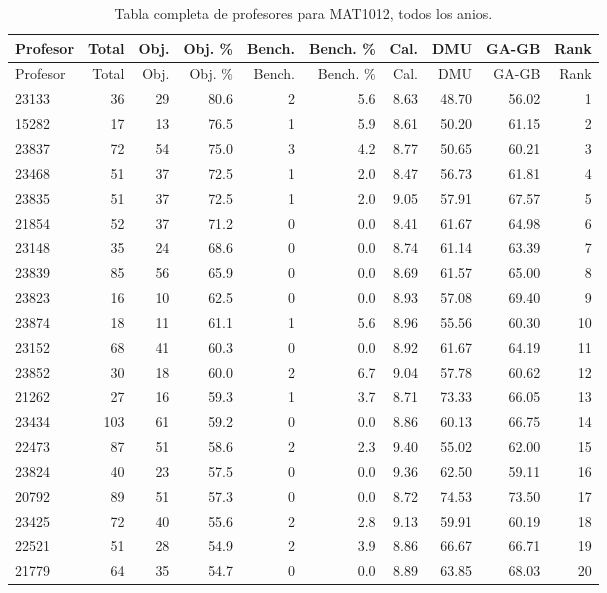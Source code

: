 \begingroup
\scriptsize
\setlength{\tabcolsep}{3pt}
\begin{longtable}{lrrrrrrrrr}
\caption{Tabla completa de profesores para MAT1012, todos los anios.}\label{tab:prof-global-mat1012}\\
\toprule
Profesor & Total & Obj. & Obj. \% & Bench. & Bench. \% & Cal. & DMU & GA-GB & Rank \\
\midrule
\endfirsthead
\toprule
Profesor & Total & Obj. & Obj. \% & Bench. & Bench. \% & Cal. & DMU & GA-GB & Rank \\
\midrule
\endhead
23133 & 36 & 29 & 80.6 & 2 & 5.6 & 8.63 & 48.70 & 56.02 & 1 \\
15282 & 17 & 13 & 76.5 & 1 & 5.9 & 8.61 & 50.20 & 61.15 & 2 \\
23837 & 72 & 54 & 75.0 & 3 & 4.2 & 8.77 & 50.65 & 60.21 & 3 \\
23468 & 51 & 37 & 72.5 & 1 & 2.0 & 8.47 & 56.73 & 61.81 & 4 \\
23835 & 51 & 37 & 72.5 & 1 & 2.0 & 9.05 & 57.91 & 67.57 & 5 \\
21854 & 52 & 37 & 71.2 & 0 & 0.0 & 8.41 & 61.67 & 64.98 & 6 \\
23148 & 35 & 24 & 68.6 & 0 & 0.0 & 8.74 & 61.14 & 63.39 & 7 \\
23839 & 85 & 56 & 65.9 & 0 & 0.0 & 8.69 & 61.57 & 65.00 & 8 \\
23823 & 16 & 10 & 62.5 & 0 & 0.0 & 8.93 & 57.08 & 69.40 & 9 \\
23874 & 18 & 11 & 61.1 & 1 & 5.6 & 8.96 & 55.56 & 60.30 & 10 \\
23152 & 68 & 41 & 60.3 & 0 & 0.0 & 8.92 & 61.67 & 64.19 & 11 \\
23852 & 30 & 18 & 60.0 & 2 & 6.7 & 9.04 & 57.78 & 60.62 & 12 \\
21262 & 27 & 16 & 59.3 & 1 & 3.7 & 8.71 & 73.33 & 66.05 & 13 \\
23434 & 103 & 61 & 59.2 & 0 & 0.0 & 8.86 & 60.13 & 66.75 & 14 \\
22473 & 87 & 51 & 58.6 & 2 & 2.3 & 9.40 & 55.02 & 62.00 & 15 \\
23824 & 40 & 23 & 57.5 & 0 & 0.0 & 9.36 & 62.50 & 59.11 & 16 \\
20792 & 89 & 51 & 57.3 & 0 & 0.0 & 8.72 & 74.53 & 73.50 & 17 \\
23425 & 72 & 40 & 55.6 & 2 & 2.8 & 9.13 & 59.91 & 60.19 & 18 \\
22521 & 51 & 28 & 54.9 & 2 & 3.9 & 8.86 & 66.67 & 66.71 & 19 \\
21779 & 64 & 35 & 54.7 & 0 & 0.0 & 8.89 & 63.85 & 68.03 & 20 \\

\end{longtable}
